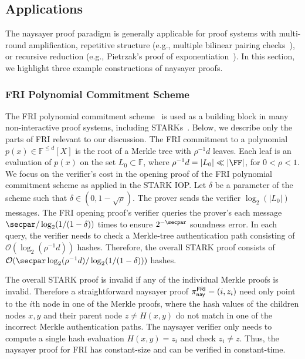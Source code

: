 \subsection{Applications}\label{sec:naysayer_apps}

The naysayer proof paradigm is generally applicable for proof systems with multi-round amplification, repetitive structure (e.g., multiple bilinear pairing checks~\cite{EPRINT:GabWilCio19}), or recursive reduction (e.g., Pietrzak's proof of exponentiation~\cite{ITCS:Pietrzak19b}). In this section, we highlight three example constructions of naysayer proofs.

\subsubsection{FRI Polynomial Commitment Scheme}\label{sec:fri_naysayer}

The FRI polynomial commitment scheme~\cite{EPRINT:BBHR18} is used as a building block in many non-interactive proof systems, including STARKs~\cite{STOC:BCGT13}.
Below, we describe only the parts of FRI relevant to our discussion. The FRI commitment to a polynomial $p(x)\in\mathbb{F}^{\leq d}[X]$ is the root of a Merkle tree with $\rho^{-1}d$ leaves. 
Each leaf is an evaluation of $p(x)$ on the set $L_0\subset\mathbb{F}$, where $\rho^{-1}d=\vert L_0\vert\ll\vert\FF\vert$, for $0<\rho<1$. We focus on the verifier's cost in the opening proof of the FRI polynomial commitment scheme as applied in the STARK IOP. Let $\delta$ be a parameter of the scheme such that $\delta\in(0,1-\sqrt{\rho})$. The prover sends the verifier $\log_2(\vert L_0\vert)$ messages. The FRI opening proof's verifier queries the prover's each message $\secpar/\log_2(1/(1-\delta))$ times to ensure $2^{-\secpar}$ soundness error. In each query, the verifier needs to check a Merkle-tree authentication path consisting of $\mathcal{O}(\log_2(\rho^{-1}d))$ hashes. Therefore, the overall STARK proof consists of $\mathcal{O}(\secpar\log_2(\rho^{-1}d)/\log_2(1/(1-\delta)))$ hashes. 

The overall STARK proof is invalid if any of the individual Merkle proofs is invalid. Therefore a straightforward naysayer proof $\pi^{\mathsf{FRI}}_{\mathsf{nay}}=(i,z_{i})$ need only point to the $i$th node in one of the Merkle proofs, where the hash values of the children nodes $x,y$ and their parent node $z\neq H(x,y)$ do not match in one of the incorrect Merkle authentication paths. The naysayer verifier only needs to compute a single hash evaluation $H(x,y)=z_{i}$ and check $z_{i}\neq z$. Thus, the naysayer proof for FRI has constant-size and can be verified in constant-time. 

